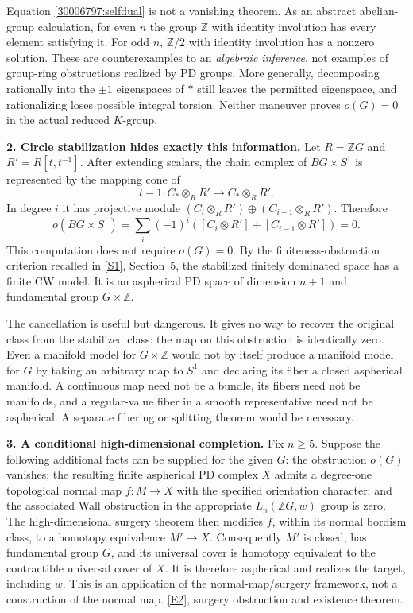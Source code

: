 \documentclass[11pt,a4paper]{article}
\newcommand{\Z}{\mathbb{Z}}
\newcommand{\sref}[2]{\hyperlink{source:#1:#2}{[S#2]}}
\newcommand{\eref}[2]{\hyperlink{extra:#1:#2}{[E#2]}}
\numberwithin{equation}{section}
\begin{document}
Equation \eqref{30006797:selfdual} is not a vanishing theorem. As an abstract
abelian-group calculation, for even $n$ the group $\Z$ with identity
involution has every element satisfying it. For odd $n$, $\Z/2$ with
identity involution has a nonzero solution. These are counterexamples to
an \emph{algebraic inference}, not examples of group-ring obstructions
realized by PD groups. More generally, decomposing rationally into the
$\pm1$ eigenspaces of $*$ still leaves the permitted eigenspace, and
rationalizing loses possible integral torsion. Neither maneuver proves
$o(G)=0$ in the actual reduced $K$-group.

\textbf{2. Circle stabilization hides exactly this information.}
Let $R=\Z G$ and $R'=R[t,t^{-1}]$. After extending scalars, the chain
complex of $BG\times S^1$ is represented by the mapping cone of
\[
 t-1:C_*\otimes_RR'\longrightarrow C_*\otimes_RR'.
\]
In degree $i$ it has projective module
$(C_i\otimes_RR')\oplus(C_{i-1}\otimes_RR')$. Therefore
\begin{equation}\label{30006797:circle}
 o(BG\times S^1)=\sum_i(-1)^i([C_i\otimes R']+[C_{i-1}\otimes R'])=0.
\end{equation}
This computation does not require $o(G)=0$. By the finiteness-obstruction
criterion recalled in \sref{30006797}{1}, Section~5, the stabilized finitely
dominated space has a finite CW model. It is an aspherical PD space of
dimension $n+1$ and fundamental group $G\times\Z$.

The cancellation is useful but dangerous. It gives no way to recover the
original class from the stabilized class: the map on this obstruction is
identically zero. Even a manifold model for $G\times\Z$ would not by
itself produce a manifold model for $G$ by taking an arbitrary map to
$S^1$ and declaring its fiber a closed aspherical manifold. A continuous
map need not be a bundle, its fibers need not be manifolds, and a
regular-value fiber in a smooth representative need not be aspherical.
A separate fibering or splitting theorem would be necessary.

\textbf{3. A conditional high-dimensional completion.}
Fix $n\ge5$. Suppose the following additional facts can be supplied for
the given $G$: the obstruction $o(G)$ vanishes; the resulting finite
aspherical PD complex $X$ admits a degree-one topological normal map
$f:M\to X$ with the specified orientation character; and the associated
Wall obstruction in the appropriate $L_n(\Z G,w)$ group is zero.
The high-dimensional surgery theorem then modifies $f$, within its
normal bordism class, to a homotopy equivalence $M'\to X$.
Consequently $M'$ is closed, has fundamental group $G$, and its universal
cover is homotopy equivalent to the contractible universal cover of $X$.
It is therefore aspherical and realizes the target, including $w$.
This is an application of the normal-map/surgery framework, not a
construction of the normal map. \eref{30006797}{2}, surgery obstruction and
existence theorem.
\end{document}
